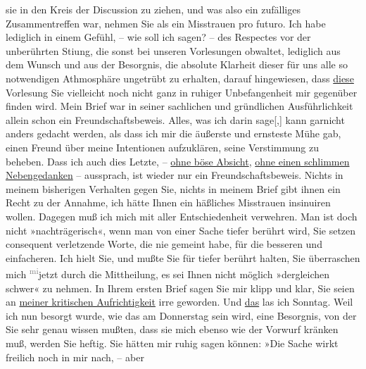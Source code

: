 \begin{ledgroupsized}[t]{13cm}
               sie in den Kreis der Discussion zu ziehen, und was also ein zufälliges
               Zusammentreffen war, nehmen Sie als ein Misstrauen pro futuro.\pend
           \pstart
           Ich habe lediglich in einem Gefühl, – wie soll ich sagen? – des Respectes vor der
               unberührten Sti{\geminationm}ung, die sonst bei unseren Vorlesungen
               obwaltet, lediglich aus dem Wunsch und aus der Besorgnis, die absolute Klarheit
               dieser für uns alle so notwendigen Athmosphäre ungetrübt zu erhalten, darauf
               hingewiesen, dass \uline{diese} Vorlesung Sie vielleicht noch
               nicht ganz in ruhiger Unbefangenheit mir gegenüber finden wird.\pend
           \pstart
           Mein Brief war in seiner sachlichen und gründlichen Ausführlichkeit allein schon ein
               Freundschaftsbeweis. Alles, was ich darin sage{[},{]} kann garnicht
               anders gedacht werden, als dass ich mir die äußerste und ernsteste Mühe gab, einen
               Freund über meine {\pb}Intentionen
               aufzuklären, seine Verstimmung zu beheben. Dass ich auch dies Letzte, – \uline{ohne böse Absicht}, \uline{ohne
                  einen schlimmen Nebengedanken} – aussprach, ist wieder nur ein
               Freundschaftsbeweis. Nichts in meinem bisherigen Verhalten gegen Sie, nichts in
               meinem Brief gibt ihnen ein Recht zu der Annahme, ich hätte Ihnen ein häßliches
               Misstrauen insinuiren wollen. Dagegen muß ich mich mit aller Entschiedenheit
               verwehren.\pend
           \pstart
           Man ist doch nicht »nachträgerisch«, wenn man von einer Sache tiefer berührt wird,
               Sie setzen consequent verletzende Worte, die  nie
               gemeint habe, für die besseren und einfacheren.\pend
           \pstart
           Ich hielt Sie, und mußte Sie für tiefer berührt halten, Sie überraschen mich \substVorne{}\textsuperscript{\textcolor{gray}{mi}}\substDazwischen{}jetzt\substHinten{} durch die Mittheilung, es sei Ihnen nicht möglich »dergleichen schwer« zu
               nehmen.\pend
           \pstart
           In Ihrem ersten Brief sagen Sie mir klipp und klar, Sie seien an \uline{meiner kritischen Aufrichtigkeit} irre geworden. Und \uline{das} las ich Sonntag.
               Weil ich nun besorgt wurde, wie das am Donnerstag sein
               wird, eine Besorgnis, von der Sie sehr genau wissen mußten, dass sie mich ebenso wie
               der Vorwurf kränken muß, werden Sie heftig.\pend
           \pstart
           Sie hätten mir ruhig sagen können: »Die Sache wirkt freilich noch in mir nach, – aber

\end{ledgroupsized}
